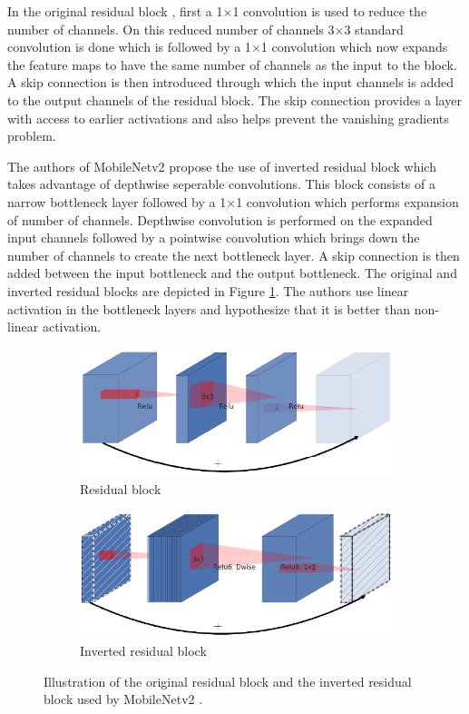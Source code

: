 In the original residual block \cite{DBLP:journals/corr/HeZRS15}, first a 1$\times$1 convolution is used to reduce the number of channels. On this reduced number of channels 3$\times$3 standard convolution is done which is followed by a 1$\times$1 convolution which now expands the feature maps to have the same number of channels as the input to the block. A skip connection is then introduced through which the input channels is added to the output channels of the residual block. The skip connection provides a layer with access to earlier activations and also helps prevent the vanishing gradients problem. 

The authors of MobileNetv2 propose the use of inverted residual block which takes advantage of depthwise seperable convolutions. This block consists of a narrow bottleneck layer followed by a 1$\times$1 convolution which performs expansion of number of channels. Depthwise convolution is performed on the expanded input channels followed by a pointwise convolution which brings down the number of channels to create the next bottleneck layer. A skip connection is then added between the input bottleneck and the output bottleneck. The original and inverted residual blocks are depicted in Figure \ref{Fig:residual}. The authors use linear activation in the bottleneck layers and hypothesize that it is better than non-linear activation.

	\begin{figure}
		\begin{subfigure}{.5\textwidth}
			\centering
			\includegraphics[width=.8\linewidth]{images/residual}
			\caption{Residual block}
		\end{subfigure}
		\begin{subfigure}{.5\textwidth}
			\centering
			\includegraphics[width=.8\linewidth]{images/inverted_residual}
			\caption{Inverted residual block}
		\end{subfigure}
		\caption{Illustration of the original residual block and the inverted residual block used by MobileNetv2 \cite{DBLP:journals/corr/abs-1801-04381}.}
		\label{Fig:residual}
	\end{figure}


